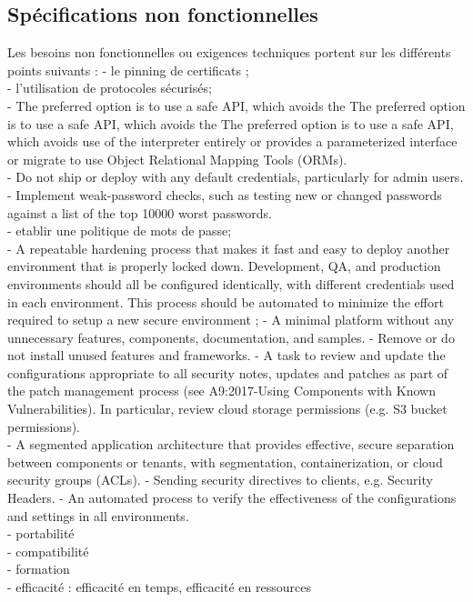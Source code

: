\subsection{Spécifications non fonctionnelles}
Les besoins non fonctionnelles ou exigences techniques portent sur les différents points suivants :
- le pinning de certificats ; \\
- l'utilisation de protocoles sécurisés; \\
- The preferred option is to use a safe API, which avoids the The preferred option is to use a safe API, which avoids the The preferred option is to use a safe API, which avoids use of the interpreter entirely or provides a parameterized interface or migrate to use Object Relational Mapping Tools (ORMs).\\
- Do not ship or deploy with any default credentials, particularly for admin users.\\
- Implement weak-password checks, such as testing new or changed passwords against a list of the top 10000 worst passwords.\\
- etablir une politique de mots de passe; \\
- A repeatable hardening process that makes it fast and easy to deploy another environment that is properly locked down. Development, QA, and production environments should all be configured identically, with different credentials used in each environment. This process should be automated to minimize the effort required to setup a new secure environment ;
- A minimal platform without any unnecessary features, components, documentation, and samples. - Remove or do not install unused features and frameworks.
- A task to review and update the configurations appropriate to all security notes, updates and patches as part of the patch management process (see A9:2017-Using Components with Known Vulnerabilities). In particular, review cloud storage permissions (e.g. S3 bucket permissions). \\
- A segmented application architecture that provides effective, secure separation between components or tenants, with segmentation, containerization, or cloud security groups (ACLs).
- Sending security directives to clients, e.g. Security Headers.
- An automated process to verify the effectiveness of the configurations and settings in all environments.\\
- portabilité \\
- compatibilité\\
- formation\\
- efficacité : efficacité en temps, efficacité en ressources\\
